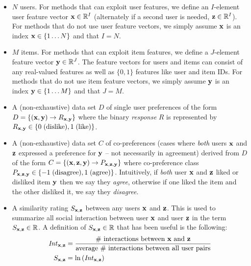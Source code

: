 \begin{itemize}
\item $N$ users.  For methods that can exploit user features, we define 
an $I$-element user feature vector 
$\mathbf{x} \in \mathbb{R}^I$ (alternately if a second user is needed, $\mathbf{z} \in \mathbb{R}^I$).
For methods that do not use user feature vectors, we simply assume $\mathbf{x}$
is an index $\mathbf{x} \in \{ 1 \ldots N \}$ and that $I=N$.

\item $M$ items.  For methods that can exploit item features, we define
a $J$-element feature vector 
$\mathbf{y} \in \mathbb{R}^J$. The feature vectors for users 
and items can consist of any real-valued features as well as $\{0,1\}$
features like user and item IDs.
For methods that do not use item feature vectors, we simply assume $\mathbf{y}$
is an index $\mathbf{y} \in \{ 1 \ldots M \}$ and that $J=M$.

\item A (non-exhaustive) data set $D$ of single user preferences of the form
$D = \{ (\mathbf{x}, \mathbf{y}) \to R_{\mathbf{x},\mathbf{y}} \}$ where 
the binary \emph{response} $R$ is represented by 
$R_{\mathbf{x},\mathbf{y}} \in \{ 0 \; \mbox{(dislike)}, 1 \; \mbox{(like)} \}$.

\item A (non-exhaustive) data set $C$ of co-preferences (cases where
\emph{both} users $\mathbf{x}$ and $\mathbf{z}$ expressed a preference for $\mathbf{y}$ -- not
necessarily in agreement) derived from $D$ of the form
$C = \{ (\mathbf{x}, \mathbf{z}, \mathbf{y}) \to P_{\mathbf{x}, \mathbf{z}, \mathbf{y}} \}$ where co-preference class 
$P_{\mathbf{x}, \mathbf{z}, \mathbf{y}} \in \{ -1 \; \mbox{(disagree)}, 1 \;\mbox{(agree)} \}$.  
Intuitively, if \emph{both} user $\mathbf{x}$ and $\mathbf{z}$ liked or disliked item 
$\mathbf{y}$ then we say they \emph{agree}, otherwise if one liked the item and
the other disliked it, we say they \emph{disagree}.

\item A similarity rating $S_{\mathbf{x},\mathbf{z}}$ between any users $\mathbf{x}$ and $\mathbf{z}$. This is used to summarize all social
interaction between user $\mathbf{x}$ and user $\mathbf{z}$ in the term $S_{\mathbf{x},\mathbf{z}} \in
\mathbb{R}$.  A definition of $S_{\mathbf{x},\mathbf{z}} \in \mathbb{R}$ that has been useful is the
following:
\begin{align}
\mathit{Int}_{\mathbf{x},\mathbf{z}} & = \frac{\mbox{\# interactions between $\mathbf{x}$
and $\mathbf{z}$}}{\mbox{average \# interactions between all user pairs}}\\
S_{\mathbf{x},\mathbf{z}} & = \ln \left( \mathit{Int}_{\mathbf{x},\mathbf{z}} \right)
\end{align}



\end{itemize}

